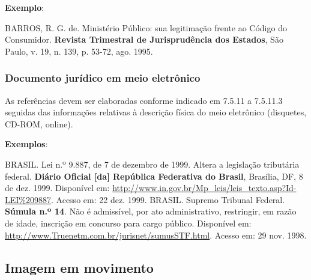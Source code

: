 \begin{exemplomanual}
\textbf{Exemplo}:\\
\begin{singlespace}
BARROS, R. G. de. Ministério Público: sua legitimação frente ao Código do Consumidor. \textbf{Revista Trimestral de Jurisprudência dos Estados}, São Paulo, v. 19, n. 139, p. 53-72, ago. 1995.
\end{singlespace}
\end{exemplomanual}


\subsubsection{Documento jurídico em meio eletrônico}

As referências devem ser elaboradas conforme indicado em 7.5.11 a 7.5.11.3 seguidas das informações relativas à descrição física do meio eletrônico (disquetes, CD-ROM, online).

\begin{flushleft}
\begin{singlespace}
\end{singlespace}
\end{flushleft}

\begin{exemplomanual}
\textbf{Exemplos}:\\
\begin{singlespace}
BRASIL. Lei n.º 9.887, de 7 de dezembro de 1999. Altera a legislação tributária federal. \textbf{Diário Oficial [da] República Federativa do Brasil}, Brasília, DF, 8 de dez. 1999. Disponível em: \url{http://www.in.gov.br/Mp_leis/leis_texto.asp?Id-LEI\%209887}. Acesso em: 22 dez. 1999.
\newline
\newline
BRASIL. Supremo Tribunal Federal. \textbf{Súmula n.º 14}. Não é admissível, por ato administrativo, restringir, em razão de idade, inscrição em concurso para cargo público. Disponível em: \url{http://www.Truenetm.com.br/jurisnet/sumusSTF.html}. Acesso em: 29 nov. 1998.
\end{singlespace}
\end{exemplomanual}


\subsection{Imagem em movimento}

